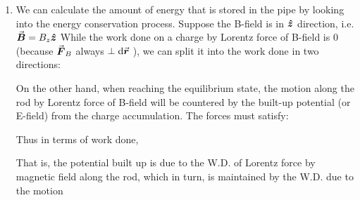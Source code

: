 \documentclass[class=article, crop=false, 12pt]{standalone}
\begin{document}
\begin{enumerate}
    \item We can calculate the amount of energy that is stored in the pipe 
    by looking into the energy conservation process.
    Suppose the B-field is in $\vu*{z}$ direction, i.e. $\va*{B}=B_z\vu*{z}$
    While the work done on a charge by Lorentz force of B-field is $0$ 
    (because $\va*{F}_B$ always $\perp \dd{\va*{r}}$ ),
    we can split it into the work done in two directions:


    On the other hand, when reaching the equilibrium state,
    the motion along the rod by Lorentz force of B-field will be countered by the 
    built-up potential (or E-field) from the charge accumulation. 
    The forces must satisfy:


    Thus in terms of work done,

    That is, the potential built up is due to the W.D. of Lorentz force by magnetic field
    along the rod,
    which in turn, is maintained by the W.D. due to the motion 


\end{enumerate}
\end{document}
